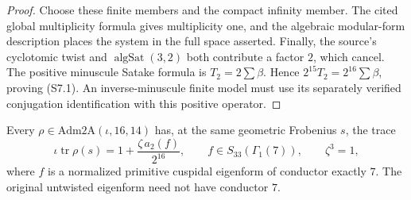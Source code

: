 \begin{proof}
Choose these finite members and the compact infinity member.
The cited global multiplicity formula gives multiplicity one, and
the algebraic modular-form description places the system in the
full space asserted. Finally, the source's cyclotomic twist and
\(\operatorname{algSat}(3,2)\) both contribute a factor \(2\), which
cancel. The positive minuscule Satake formula is
\(T_2=2\sum\beta\). Hence \(2^{15}T_2=2^{16}\sum\beta\), proving
(S7.1). An inverse-minuscule finite model must use its separately
verified conjugation identification with this positive operator.
\end{proof}

\begin{lemma}\label{lem:minus7-gl2-conductor}
Every \(\rho\in\mathrm{Adm2A}(\iota,16,14)\) has, at the same
geometric Frobenius \(s\), the trace
\[
 \iota\operatorname{tr}\rho(s)
   =1+\frac{\zeta\,a_2(f)}{2^{16}},
 \qquad f\in S_{33}(\Gamma_1(7)),\qquad \zeta^3=1,
 \tag{S7.3}
\]
where \(f\) is a normalized primitive cuspidal eigenform of
conductor exactly \(7\). The original untwisted eigenform need
not have conductor \(7\).
\end{lemma}

